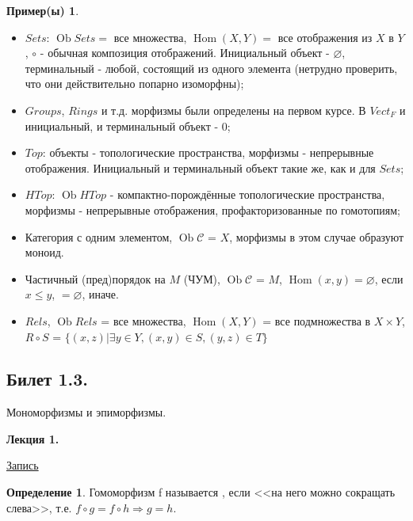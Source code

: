 \documentclass[a4paper]{article}
\newcommand{\mybox}{%
    \collectbox{%
        \setlength{\fboxsep}{1pt}%
        \fbox{\BOXCONTENT}%
    }%
}
\theoremstyle{indented}
\theoremstyle{definition}
\newtheorem{defn}{Определение}
\newtheorem{exl}{Пример(ы)}
\theoremstyle{remark}
\DeclareMathOperator{\Ra}{\Rightarrow}
\DeclareMathOperator{\Hom}{Hom}
\DeclareMathOperator{\Ob}{Ob}
\begin{document}
\begin{exl} \
    \begin{itemize}
        \item $Sets$: $\Ob Sets=$ все множества, $\Hom (X, Y)=$ все отображения из $X$ в $Y$, $\circ $ - обычная композиция отображений. Инициальный объект - $\varnothing$, терминальный - любой, состоящий из одного элемента (нетрудно проверить, что они действительно попарно изоморфны);
        \item $Groups$, $Rings$ и т.д. морфизмы были определены на первом курсе. В $Vect_{F}$ и инициальный, и терминальный объект - 0;
        \item $Top$: объекты - топологические пространства, морфизмы - непрерывные отображения. Инициальный и терминальный объект такие же, как и для $Sets$;
        \item $HTop$: $\Ob HTop$ - компактно-порождённые топологические пространства, морфизмы - непрерывные отображения, профакторизованные по гомотопиям;
        \item Категория с одним элементом, $\Ob\mathcal{C}$ = ${X}$, морфизмы в этом случае образуют моноид.
        \item Частичный (пред)порядок на $M$ (ЧУМ), $\Ob\mathcal{C}$ = $M$, $\Hom (x, y) = {\varnothing}$, если $x\leq y$, $=\varnothing$, иначе.
        \item $Rels$, $\Ob Rels$ = все множества, $\Hom (X, Y)$ = все подмножества в $X\times{Y}$, $R\circ  S$ = $\lbrace(x, z) \vert \exists y \in Y, (x, y)\in S, (y, z)\in T\rbrace$
    \end{itemize}
\end{exl}



\newpage

\subsection{Билет 1.3.}

Мономорфизмы и эпиморфизмы. 

\hrulefill

\textbf{Лекция 1.} 

\begin{flushright}
    \mybox{
        \href{https://disk.yandex.ru/d/knoQ44wLmGDwwQ/2021-2022%20учебный%20год%20(осенний%20семестр)/2%20курс/Теоретическая%20информатика/Теор%20информатика%2C%20лекция%2C%2001.09.2021.mp4}{Запись}
    }
\end{flushright}

\begin{defn}
    Гомоморфизм f называется , если <<на него можно сокращать слева>>, т.е. $f \circ g = f \circ h \Ra g = h$.
\end{defn}
\end{document}
